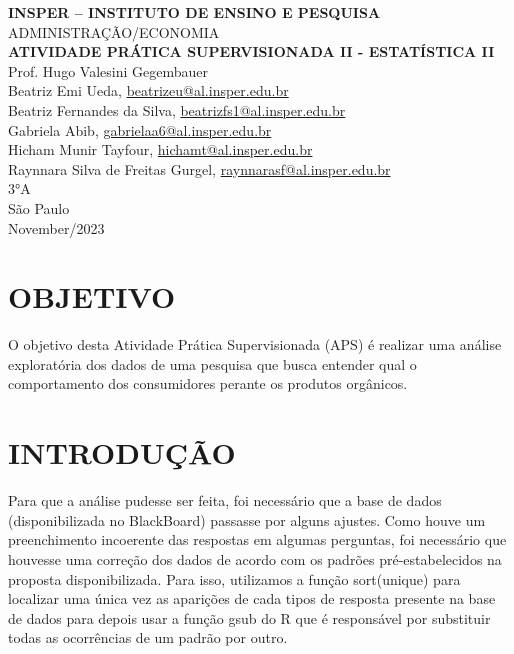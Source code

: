 \documentclass[a4paper,12pt]{article}[abntex2]
\begin{document}
\begin{titlepage}
    \centering
    \vspace*{1cm}
    \Large\textbf{INSPER – INSTITUTO DE ENSINO E PESQUISA}\\
    \Large ADMINISTRAÇÃO/ECONOMIA\\
    \vspace{1.5cm}
    \Large\textbf{ATIVIDADE PRÁTICA SUPERVISIONADA II - ESTATÍSTICA II}\\
    \vspace{1.5cm}
    \large Prof. Hugo Valesini Gegembauer\\
    \vfill
    \normalsize
    Beatriz Emi Ueda, \href{mailto:beatrizeu@al.insper.edu.br}{beatrizeu@al.insper.edu.br}\\
    Beatriz Fernandes da Silva, \href{mailto:beatrizfs1@al.insper.edu.br}{beatrizfs1@al.insper.edu.br}\\
    Gabriela Abib, \href{mailto:gabrielaa6@al.insper.edu.br}{gabrielaa6@al.insper.edu.br}\\
    Hicham Munir Tayfour, \href{mailto:hichamt@al.insper.edu.br}{hichamt@al.insper.edu.br}\\
    Raynnara Silva de Freitas Gurgel, \href{mailto:raynnarasf@al.insper.edu.br}{raynnarasf@al.insper.edu.br}\\
    3°A\\
    \vfill
    São Paulo\\
    November/2023
    
\end{titlepage}

\newpage
\tableofcontents
\thispagestyle{empty} %
\newpage
\setcounter{page}{1} %
\justify
\onehalfspacing

\pagestyle{fancy}
\fancyhf{}
\rhead{\thepage}

\section{\textbf{OBJETIVO}}
O objetivo desta Atividade Prática Supervisionada (APS) é realizar uma análise exploratória dos dados de uma pesquisa que busca entender qual o comportamento dos consumidores perante os produtos orgânicos.  

\section{\textbf{INTRODUÇÃO}}
Para que a análise pudesse ser feita, foi necessário que a base de dados (disponibilizada no BlackBoard) passasse por alguns ajustes. Como houve um preenchimento incoerente das respostas em algumas perguntas, foi necessário que houvesse uma correção dos dados de acordo com os padrões pré-estabelecidos na proposta disponibilizada. Para isso, utilizamos a função sort(unique) para localizar uma única vez as aparições de cada tipos de resposta presente na base de dados para depois usar a função gsub do R que é responsável por substituir todas as ocorrências de um padrão por outro.  
\end{document}
